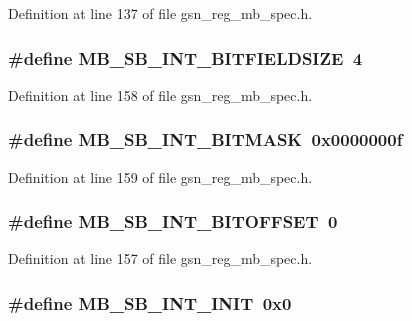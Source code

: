 Definition at line 137 of file gsn\_\-reg\_\-mb\_\-spec.h.

\hypertarget{a00562_a203d0aa8cdd507ef4498527c18e35267}{
\subsubsection[{MB\_\-SB\_\-INT\_\-BITFIELDSIZE}]{\setlength{\rightskip}{0pt plus 5cm}\#define MB\_\-SB\_\-INT\_\-BITFIELDSIZE~4}}
\label{a00562_a203d0aa8cdd507ef4498527c18e35267}


Definition at line 158 of file gsn\_\-reg\_\-mb\_\-spec.h.

\hypertarget{a00562_a354b62db59cc4e5a0ab67a8b4d260326}{
\subsubsection[{MB\_\-SB\_\-INT\_\-BITMASK}]{\setlength{\rightskip}{0pt plus 5cm}\#define MB\_\-SB\_\-INT\_\-BITMASK~0x0000000f}}
\label{a00562_a354b62db59cc4e5a0ab67a8b4d260326}


Definition at line 159 of file gsn\_\-reg\_\-mb\_\-spec.h.

\hypertarget{a00562_a9c3af46d5606a6e7e61d674fa2637fa3}{
\subsubsection[{MB\_\-SB\_\-INT\_\-BITOFFSET}]{\setlength{\rightskip}{0pt plus 5cm}\#define MB\_\-SB\_\-INT\_\-BITOFFSET~0}}
\label{a00562_a9c3af46d5606a6e7e61d674fa2637fa3}


Definition at line 157 of file gsn\_\-reg\_\-mb\_\-spec.h.

\hypertarget{a00562_a7a51e5f5a292ff0557e0f9106bf1ea11}{
\subsubsection[{MB\_\-SB\_\-INT\_\-INIT}]{\setlength{\rightskip}{0pt plus 5cm}\#define MB\_\-SB\_\-INT\_\-INIT~0x0}}
\label{a00562_a7a51e5f5a292ff0557e0f9106bf1ea11}


